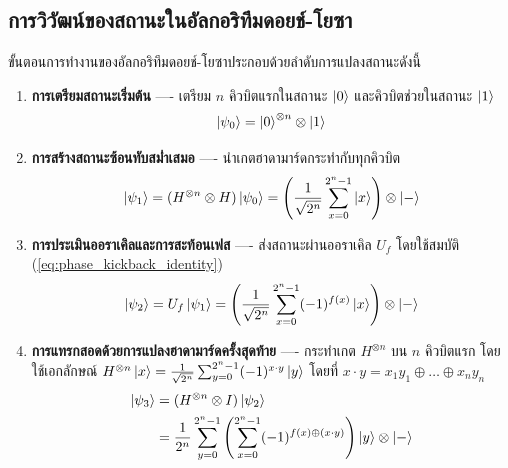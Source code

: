 \subsection{การวิวัฒน์ของสถานะในอัลกอริทึมดอยช์-โยซา}
ขั้นตอนการทำงานของอัลกอริทึมดอยช์-โยซาประกอบด้วยลำดับการแปลงสถานะดังนี้
\begin{enumerate}
    \item \textbf{การเตรียมสถานะเริ่มต้น} ---- เตรียม $n$ คิวบิตแรกในสถานะ $\ket{0}$ และคิวบิตช่วยในสถานะ $\ket{1}$
    \begin{equation}
    \ket{\psi_0} = \ket{0}^{\otimes n} \otimes \ket{1}
    \end{equation}
    \item \textbf{การสร้างสถานะซ้อนทับสม่ำเสมอ} ---- นำเกตฮาดามาร์ดกระทำกับทุกคิวบิต
    \begin{equation}
    \ket{\psi_1} = (H^{\otimes n} \otimes H)\ket{\psi_0} = \left( \frac{1}{\sqrt{2^n}} \sum_{x=0}^{2^n-1} \ket{x} \right) \otimes \ket{-}
    \end{equation}
    \item \textbf{การประเมินออราเคิลและการสะท้อนเฟส} ---- ส่งสถานะผ่านออราเคิล $U_f$ โดยใช้สมบัติ (\ref{eq:phase_kickback_identity})
    \begin{equation}
    \ket{\psi_2} = U_f \ket{\psi_1} = \left( \frac{1}{\sqrt{2^n}} \sum_{x=0}^{2^n-1} (-1)^{f(x)} \ket{x} \right) \otimes \ket{-}
    \end{equation}
    \item \textbf{การแทรกสอดด้วยการแปลงฮาดามาร์ดครั้งสุดท้าย} ---- กระทำเกต $H^{\otimes n}$ บน $n$ คิวบิตแรก โดยใช้เอกลักษณ์ $H^{\otimes n}\ket{x} = \frac{1}{\sqrt{2^n}}\sum_{y=0}^{2^n-1} (-1)^{x \cdot y} \ket{y}$ โดยที่ $x \cdot y = x_1 y_1 \oplus \dots \oplus x_n y_n$
    \begin{align}
    \ket{\psi_3} &= (H^{\otimes n} \otimes I) \ket{\psi_2} \nonumber \\
    &= \frac{1}{2^n} \sum_{y=0}^{2^n-1} \left( \sum_{x=0}^{2^n-1} (-1)^{f(x) \oplus (x \cdot y)} \right) \ket{y} \otimes \ket{-}
    \label{eq:deutsch_jozsa_final_expansion}
    \end{align}
\end{enumerate}

